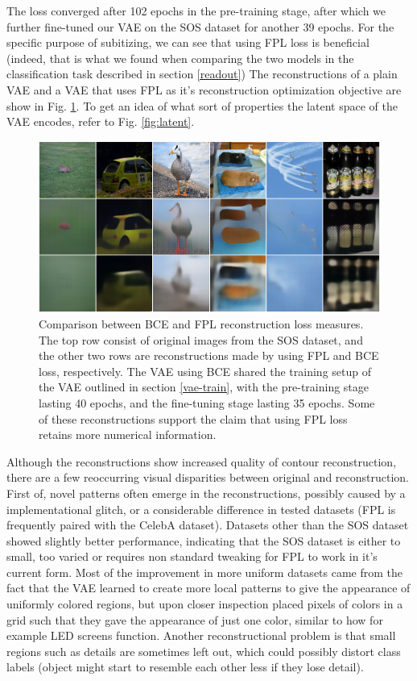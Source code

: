 \documentclass[twocolumn]{article}
\begin{document}
The loss converged after 102 epochs in the pre-training stage, after which we further fine-tuned our VAE on the SOS dataset for another 39 epochs.
For the specific purpose of subitizing, we can see that using FPL loss
is beneficial (indeed, that is what we found when comparing the two
models in the classification task described in
section \ref{readout}) The reconstructions of a plain
VAE and a VAE that uses FPL as it's reconstruction optimization
objective are show in Fig. \ref{fig:dfc_comp}. To get an idea of what sort of
properties the latent space of the VAE encodes, refer to Fig. \ref{fig:latent}.

\begin{figure}
\centering
\includegraphics{dfc_bce.png}
\caption{Comparison between BCE and FPL reconstruction loss measures. The top row consist of original images from the SOS dataset, and the other two rows are reconstructions made by using FPL and BCE loss, respectively. The VAE using BCE shared the training setup of the VAE outlined in section \ref{vae-train}, with the pre-training stage lasting 40 epochs, and the fine-tuning stage lasting 35 epochs. Some of these reconstructions support the claim that using FPL loss retains more numerical information.}
\label{fig:dfc_comp}
\end{figure}

Although the reconstructions show increased quality of contour
reconstruction, there are a few reoccurring visual disparities between
original and reconstruction. First of, novel patterns often emerge in
the reconstructions, possibly caused by a implementational glitch, or a
considerable difference in tested datasets (FPL is frequently paired
with the CelebA \citep{liu2015deep} dataset). Datasets other than the
SOS dataset showed slightly better performance, indicating that the SOS
dataset is either to small, too varied or requires non standard tweaking
for FPL to work in it's current form. Most of the improvement in more
uniform datasets came from the fact that the VAE learned to create more
local patterns to give the appearance of uniformly colored regions, but
upon closer inspection placed pixels of colors in a grid such that they
gave the appearance of just one color, similar to how for example LED
screens function. Another reconstructional problem is that small regions such as details are sometimes left out, which
could possibly distort class labels (object might start to resemble each
other less if they lose detail).
\end{document}
